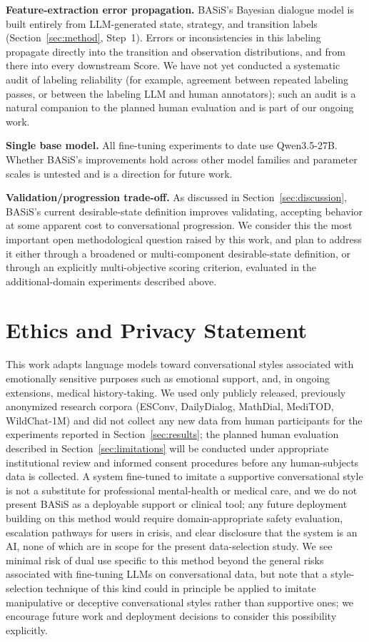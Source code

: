 \documentclass[manuscript,review,anonymous]{acmart}
\begin{document}
\textbf{Feature-extraction error propagation.} BASiS's Bayesian dialogue model is built entirely from LLM-generated state, strategy, and transition labels (Section~\ref{sec:method}, Step~1). Errors or inconsistencies in this labeling propagate directly into the transition and observation distributions, and from there into every downstream Score. We have not yet conducted a systematic audit of labeling reliability (for example, agreement between repeated labeling passes, or between the labeling LLM and human annotators); such an audit is a natural companion to the planned human evaluation and is part of our ongoing work.

\textbf{Single base model.} All fine-tuning experiments to date use Qwen3.5-27B. Whether BASiS's improvements hold across other model families and parameter scales is untested and is a direction for future work.

\textbf{Validation/progression trade-off.} As discussed in Section~\ref{sec:discussion}, BASiS's current desirable-state definition improves validating, accepting behavior at some apparent cost to conversational progression. We consider this the most important open methodological question raised by this work, and plan to address it either through a broadened or multi-component desirable-state definition, or through an explicitly multi-objective scoring criterion, evaluated in the additional-domain experiments described above.


\section*{Ethics and Privacy Statement}
This work adapts language models toward conversational styles associated with emotionally sensitive purposes such as emotional support, and, in ongoing extensions, medical history-taking. We used only publicly released, previously anonymized research corpora (ESConv, DailyDialog, MathDial, MediTOD, WildChat-1M) and did not collect any new data from human participants for the experiments reported in Section~\ref{sec:results}; the planned human evaluation described in Section~\ref{sec:limitations} will be conducted under appropriate institutional review and informed consent procedures before any human-subjects data is collected. A system fine-tuned to imitate a supportive conversational style is not a substitute for professional mental-health or medical care, and we do not present BASiS as a deployable support or clinical tool; any future deployment building on this method would require domain-appropriate safety evaluation, escalation pathways for users in crisis, and clear disclosure that the system is an AI, none of which are in scope for the present data-selection study. We see minimal risk of dual use specific to this method beyond the general risks associated with fine-tuning LLMs on conversational data, but note that a style-selection technique of this kind could in principle be applied to imitate manipulative or deceptive conversational styles rather than supportive ones; we encourage future work and deployment decisions to consider this possibility explicitly.
\end{document}
